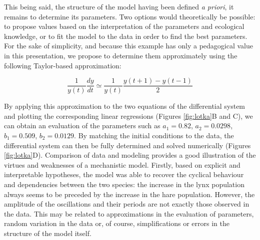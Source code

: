 \documentclass[a4paper,12pt,twoside,onecolumn,openright,final,oldfontcommands]{memoir}
\begin{document}
This being said, the structure of the model having been defined \emph{a
priori}, it remains to determine its parameters. Two options would
theoretically be possible: to propose values based on the interpretation
of the parameters and ecological knowledge, or to fit the model to the
data in order to find the best parameters. For the sake of simplicity,
and because this example has only a pedagogical value in this
presentation, we propose to determine them approximately using the
following Taylor-based approximation:

\[\dfrac{1}{y(t)} \dfrac{dy}{dt} \simeq \dfrac{1}{y(t)} \dfrac{y(t+1)-y(t-1)}{2}\]

By applying this approximation to the two equations of the differential
system and plotting the corresponding linear regressions (Figures
\ref{fig:lotka}B and C), we can obtain an evaluation of the parameters
such as \(a_1=0.82\), \(a_2=0.0298\), \(b_1=0.509\), \(b_2=0.0129\). By
matching the initial conditions to the data, the differential system can
then be fully determined and solved numerically (Figures
\ref{fig:lotka}D). Comparison of data and modeling provides a good
illustration of the virtues and weaknesses of a mechanistic model.
Firstly, based on explicit and interpretable hypotheses, the model was
able to recover the cyclical behaviour and dependencies between the two
species: the increase in the lynx population always seems to be preceded
by the increase in the hare population. However, the amplitude of the
oscillations and their periods are not exactly those observed in the
data. This may be related to approximations in the evaluation of
parameters, random variation in the data or, of course, simplifications
or errors in the structure of the model itself.
\end{document}
